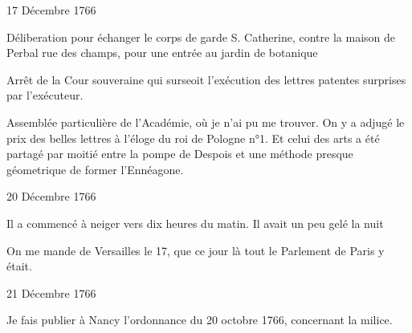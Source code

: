                      \begin{diary}{17 Décembre 1766}{}
                        
                         Déliberation pour échanger le corps de garde
                              S. Catherine, contre la maison de Perbal rue
                              des champs, pour une entrée au jardin de botanique
                        \bigskip
        
        
                         Arrêt de la Cour souveraine qui surseoit l’exécution des
                           lettres patentes surprises par
                           l’exécuteur. \bigskip
        
        
                         Assemblée particulière de l’Académie,
                           où je n’ai pu me trouver. On y a adjugé
                           le prix des belles lettres à l’éloge du roi de Pologne n°1.
                           Et celui des arts a été partagé par moitié
                           entre la pompe de Despois et une méthode
                              presque géometrique de former l’Ennéagone. \bigskip
        
        
                     \end{diary}

                     \begin{diary}{20 Décembre 1766}{}
                        
                         Il a commencé à neiger vers dix heures
                           du matin. Il avait un peu gelé la nuit \bigskip
        
        
                         On me mande de Versailles
                           le 17, que ce jour là
                           tout le Parlement de Paris
                           y était. \bigskip
        
        
                     \end{diary}
                     
                     
                     \begin{diary}{21 Décembre 1766}{}
                        
                         Je fais publier à Nancy l’ordonnance du 20
                              octobre 1766, concernant la milice. \bigskip
        
        
                     \end{diary}

